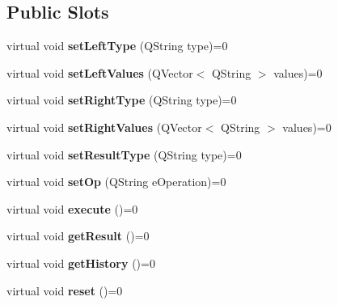 \subsection*{Public Slots}
\begin{DoxyCompactItemize}
\item 
\mbox{\label{class_model_a61d4e70e34d66e77bd508016be6e9637}} 
virtual void {\bfseries set\+Left\+Type} (Q\+String type)=0
\item 
\mbox{\label{class_model_ac3c03d44daacd6ad697481c576596592}} 
virtual void {\bfseries set\+Left\+Values} (Q\+Vector$<$ Q\+String $>$ values)=0
\item 
\mbox{\label{class_model_a967c3fccc96188c8087b1062045af857}} 
virtual void {\bfseries set\+Right\+Type} (Q\+String type)=0
\item 
\mbox{\label{class_model_aed3bb530900e322630e2e39eb780991f}} 
virtual void {\bfseries set\+Right\+Values} (Q\+Vector$<$ Q\+String $>$ values)=0
\item 
\mbox{\label{class_model_aac934ac17dd66822dbbc074c2d8808b5}} 
virtual void {\bfseries set\+Result\+Type} (Q\+String type)=0
\item 
\mbox{\label{class_model_ac58ba62771e20dd87da313b7e399df69}} 
virtual void {\bfseries set\+Op} (Q\+String e\+Operation)=0
\item 
\mbox{\label{class_model_a95509d1e8dd8acff059eec72ac75f496}} 
virtual void {\bfseries execute} ()=0
\item 
\mbox{\label{class_model_a00ecb7bd9d19ba145a1ec536539fe08f}} 
virtual void {\bfseries get\+Result} ()=0
\item 
\mbox{\label{class_model_a7328dea3602ce9c290c6821fba74cc6b}} 
virtual void {\bfseries get\+History} ()=0
\item 
\mbox{\label{class_model_a6e2f20f21dccde450c3eb1b8eef3126b}} 
virtual void {\bfseries reset} ()=0
\end{DoxyCompactItemize}
